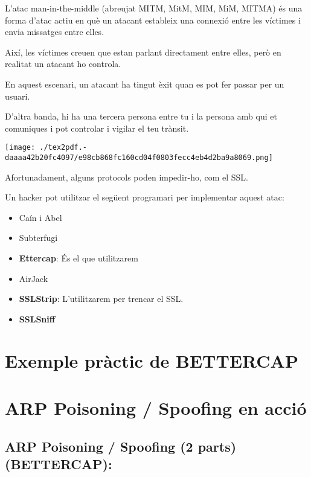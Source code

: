 \documentclass[]{article}
\begin{document}
L'atac man-in-the-middle (abreujat MITM, MitM, MIM, MiM, MITMA) és una
forma d'atac actiu en què un atacant estableix una connexió entre les
víctimes i envia missatges entre elles.

Així, les víctimes creuen que estan parlant directament entre elles,
però en realitat un atacant ho controla.

En aquest escenari, un atacant ha tingut èxit quan es pot fer passar per
un usuari.

D'altra banda, hi ha una tercera persona entre tu i la persona amb qui
et comuniques i pot controlar i vigilar el teu trànsit.

\texttt{[image: ./tex2pdf.-daaaa42b20fc4097/e98cb868fc160cd04f0803fecc4eb4d2ba9a8069.png]}

Afortunadament, alguns protocols poden impedir-ho, com el SSL.

Un hacker pot utilitzar el següent programari per implementar aquest
atac:

\begin{itemize}
\item
  Caín i Abel
\item
  Subterfugi
\item
  \textbf{Ettercap}: És el que utilitzarem
\item
  AirJack
\item
  \textbf{SSLStrip}: L'utilitzarem per trencar el SSL.
\item
  \textbf{SSLSniff}
\end{itemize}

\hypertarget{exemple-pruxe0ctic-de-bettercap}{%
\section{\texorpdfstring{\textbf{Exemple pràctic de
BETTERCAP}}{Exemple pràctic de BETTERCAP}}\label{exemple-pruxe0ctic-de-bettercap}}

\hypertarget{arp-poisoning-spoofing-en-acciuxf3}{%
\section{\texorpdfstring{\textbf{ARP Poisoning / Spoofing en
acció}}{ARP Poisoning / Spoofing en acció}}\label{arp-poisoning-spoofing-en-acciuxf3}}

\hypertarget{arp-poisoning-spoofing-2-parts-bettercap}{%
\subsection{\texorpdfstring{\textbf{ARP Poisoning / Spoofing (2 parts)
(BETTERCAP)}:}{ARP Poisoning / Spoofing (2 parts) (BETTERCAP):}}\label{arp-poisoning-spoofing-2-parts-bettercap}}
\end{document}

